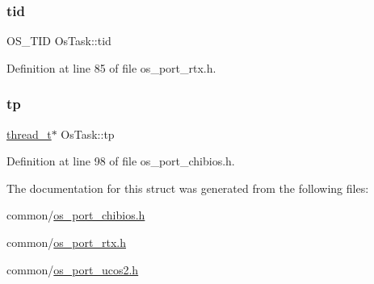 \subsubsection{\texorpdfstring{tid}{tid}}
{\footnotesize\ttfamily O\+S\+\_\+\+T\+ID Os\+Task\+::tid}



Definition at line 85 of file os\+\_\+port\+\_\+rtx.\+h.

\mbox{\label{structOsTask_a15ff6cfe36feccb799584246a1ce065f}} 
\subsubsection{\texorpdfstring{tp}{tp}}
{\footnotesize\ttfamily \hyperlink{os__port__chibios_8h_a608886e38de551d883250e166014c151}{thread\+\_\+t}$\ast$ Os\+Task\+::tp}



Definition at line 98 of file os\+\_\+port\+\_\+chibios.\+h.



The documentation for this struct was generated from the following files\+:\begin{DoxyCompactItemize}
\item 
common/\hyperlink{os__port__chibios_8h}{os\+\_\+port\+\_\+chibios.\+h}\item 
common/\hyperlink{os__port__rtx_8h}{os\+\_\+port\+\_\+rtx.\+h}\item 
common/\hyperlink{os__port__ucos2_8h}{os\+\_\+port\+\_\+ucos2.\+h}\end{DoxyCompactItemize}
